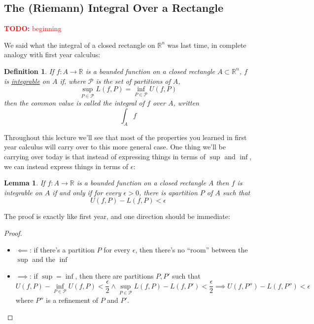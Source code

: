 \documentclass{article}
\newtheorem{lemma}{Lemma}
\newtheorem{definition}{Definition}
\newcommand{\reals}[0]{\mathbb{R}}
\newcommand{\mc}[1]{\mathcal{#1}}
\newcommand{\TODO}[1]{\textcolor{red}{\textbf{TODO:} #1}}
\begin{document}
\subsection{The (Riemann) Integral Over a Rectangle}

\TODO{beginning}

We said what the integral of a closed rectangle on \(\reals^n\) was last time, in complete analogy with first year calculus:
\begin{definition}
  If \(f: A \to \reals\) is a bounded function on a closed rectangle \(A \subset \reals^n\), \(f\) is \underline{integrable} on \(A\) if, where \(\mc{P}\) is the set of partitions of \(A\),
  \begin{equation}\sup_{P \in \mc{P}} L(f, P) = \inf_{P \in \mc{P}} U(f, P)\end{equation}
  then the common value is called the integral of \(f\) over \(A\), written
  \begin{equation}\int_Af\end{equation}
\end{definition}
Throughout this lecture we'll see that most of the properties you learned in first year calculus will carry over to this more general case. One thing we'll be carrying over today is that instead of expressing things in terms of \(\sup\) and \(\inf\), we can instead express things in terms of \(\epsilon\):
\begin{lemma}
  If \(f: A \to \reals\) is a bounded function on a closed rectangle \(A\) then \(f\) is integrable on \(A\) if and only if for every \(\epsilon > 0\), there is apartition \(P\) of \(A\) such that
  \begin{equation}U(f, P) - L(f, P) < \epsilon\end{equation}
\end{lemma}
The proof is exactly like first year, and one direction should be immediate:
\begin{proof}
\begin{itemize}
  \item \(\impliedby\): if there's a partition \(P\) for every \(\epsilon\), then there's no ``room'' between the \(\sup\) and the \(\inf\)
  \item \(\implies\): if \(\sup = \inf\), then there are partitions \(P, P'\) such that
  \begin{equation}U(f, P) - \inf_{P \in \mc{P}} U(f, P) < \frac{\epsilon}{2} \land \sup_{P \in \mc{P}}L(f, P) - L(f, P') < \frac{\epsilon}{2} \implies U(f, P'') - L(f, P'') < \epsilon\end{equation}
  where \(P''\) is a refinement of \(P\) and \(P'\).
\end{itemize}
\end{proof}
\end{document}
